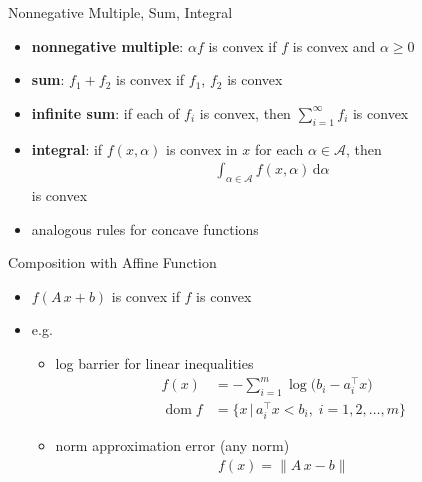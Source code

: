 \documentclass[10pt]{beamer}
\newcommand{\ds}{\displaystyle}
\DeclareMathOperator*{\dom}{dom}
\theoremstyle{definition}
\begin{document}
\begin{frame}{Nonnegative Multiple, Sum, Integral}
  \begin{itemize}
    \item {\bf nonnegative multiple}: $\alpha f$ is convex if $f$ is convex and $\alpha\geqslant 0$
    \item {\bf sum}: $f_1 + f_2$ is convex if $f_1$, $f_2$ is convex
    \item {\bf infinite sum}: if each of $\ds f_i$ is convex, then $\ds\sum_{i = 1}^\infty f_i$ is convex
    \item {\bf integral}: if $\ds f(x, \alpha)$ is convex in $x$ for each $\alpha\in\mathcal{A}$, then 
      \begin{align*}
        \int_{\alpha\in\mathcal{A}}f(x,\alpha)\,\text{d}\alpha
      \end{align*} 
      is convex
    \item analogous rules for concave functions
  \end{itemize}
\end{frame}

\begin{frame}{Composition with Affine Function}
  \begin{itemize}
    \item $\ds f(A\,x + b)$ is convex if $f$ is convex
    \item e.g.
      \begin{itemize}
        \item log barrier for linear inequalities
          \begin{align*}
            f(x) &= - \sum_{i = 1}^m \log\big(b_i - a_i^\top x\big) \\
            \dom f &= \{x\,|\,a_i^\top x < b_i,\;i=1,2,\ldots,m\}
          \end{align*}
        \item norm approximation error (any norm)
          \begin{align*}
            f(x) = \|A\,x - b\|
          \end{align*}
      \end{itemize}
  \end{itemize}
\end{frame}
\end{document}
